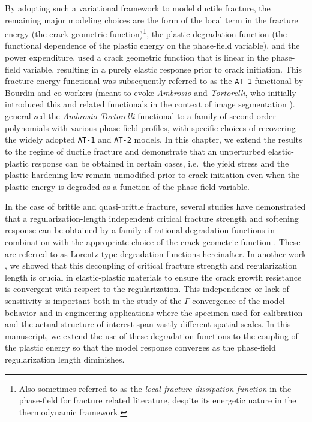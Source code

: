 By adopting such a variational framework to model ductile fracture, the remaining major modeling choices are the form of the local term in the fracture energy (the crack geometric function)\footnote{Also sometimes referred to as the \textit{local fracture dissipation function} in the phase-field for fracture related literature, despite its energetic nature in the thermodynamic framework.}, the plastic degradation function (the functional dependence of the plastic energy on the phase-field variable), and the power expenditure. \citet{pham2013onset} used a crack geometric function that is linear in the phase-field variable, resulting in a purely elastic response prior to crack initiation.  This fracture energy functional was subsequently referred to as the \texttt{AT-1} functional by Bourdin and co-workers (meant to evoke \textit{Ambrosio} and \textit{Tortorelli}, who initially introduced this and related functionals in the context of image segmentation \cite{ambrosio1990approximation}). \citet{wu2017unified} generalized the \textit{Ambrosio-Tortorelli} functional \cite{ambrosio1990approximation} to a family of second-order polynomials with various phase-field profiles, with specific choices of recovering the widely adopted \texttt{AT-1} and \texttt{AT-2} models. In this chapter, we extend the results to the regime of ductile fracture and demonstrate that an unperturbed elastic-plastic response can be obtained in certain cases, i.e.\ the yield stress and the plastic hardening law remain unmodified prior to crack initiation even when the plastic energy is degraded as a function of the phase-field variable.


In the case of brittle and quasi-brittle fracture, several studies have demonstrated that a regularization-length independent critical fracture strength and softening response can be obtained by a family of rational degradation functions in combination with the appropriate choice of the crack geometric function \cite{lorentz2011convergence, wu2017unified, geelen2019phase}. These are referred to as Lorentz-type degradation functions hereinafter.  In another work \cite{brandon2020cohesive}, we showed that this decoupling of critical fracture strength and regularization length is crucial in elastic-plastic materials to ensure the crack growth resistance is convergent with respect to the regularization. This independence or lack of sensitivity is important both in the study of the $\Gamma$-convergence of the model behavior and in engineering applications where the specimen used for calibration and the actual structure of interest span vastly different spatial scales. In this manuscript, we extend the use of these degradation functions to the coupling of the plastic energy so that the model response converges as the phase-field regularization length diminishes.

